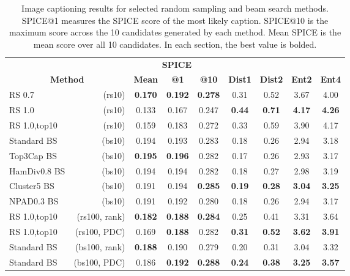 \documentclass[thesis.tex]{subfiles}
\begin{document}
\begin{table*}
    \small
    \centering
\begin{tabular}{|lr||ccc||cccc|}
\hline
 & & \multicolumn{3}{c||}{\textbf{SPICE}} & & & & \\
\multicolumn{2}{|c||}{\textbf{Method}} & \textbf{Mean} & \textbf{@1} & \textbf{@10} & \textbf{Dist1} & \textbf{Dist2} & \textbf{Ent2} & \textbf{Ent4}  \\
\hline\hline
RS 0.7 &(rs10)               & \textbf{0.170} & \textbf{0.192} & \textbf{0.278} & 0.31 & 0.52 & 3.67 & 4.00 \\
RS 1.0 &(rs10)               & 0.133 & 0.167 & 0.247 & \textbf{0.44} & \textbf{0.71} & \textbf{4.17} & \textbf{4.26} \\
RS 1.0,top10 &(rs10)         & 0.159 & 0.183 & 0.272 & 0.33 & 0.59 & 3.90 & 4.17 \\
\hline \hline
Standard BS &(bs10)               & 0.194 & 0.193 & 0.283 & 0.18 & 0.26 & 2.94 & 3.18 \\
Top3Cap BS &(bs10)                & \textbf{0.195} & \textbf{0.196} & 0.282 & 0.17 & 0.26 & 2.93 & 3.17 \\
HamDiv0.8 BS &(bs10)              & 0.194 & 0.194 & 0.282 & 0.18 & 0.27 & 2.98 & 3.19 \\
Cluster5 BS &(bs10)               & 0.191 & 0.194 & \textbf{0.285} & \textbf{0.19} & \textbf{0.28} & \textbf{3.04} & \textbf{3.25} \\
NPAD0.3 BS &(bs10)                & 0.191 & 0.192 & 0.280 & 0.18 & 0.26 & 2.94 & 3.17 \\
\hline \hline
RS 1.0,top10 &(rs100, rank)  & \textbf{0.182} & \textbf{0.188} & \textbf{0.284} & 0.25 & 0.41 & 3.31 & 3.64 \\
RS 1.0,top10 &(rs100, PDC)   & 0.169 & \textbf{0.188} & 0.282 & \textbf{0.31} & \textbf{0.52} & \textbf{3.62} & \textbf{3.91} \\
\hline \hline
Standard BS &(bs100, rank)        & \textbf{0.188} & 0.190 & 0.279 & 0.20 & 0.31 & 3.04 & 3.32 \\
Standard BS &(bs100, PDC)         & 0.186 & \textbf{0.192} & \textbf{0.288} & \textbf{0.24} & \textbf{0.38} & \textbf{3.25} & \textbf{3.57} \\
\hline
\end{tabular}
\caption{Image captioning results for selected random sampling and beam search methods. SPICE@1 measures the SPICE score of the most likely caption. SPICE@10 is the maximum score across the 10 candidates generated by each method. Mean SPICE is the mean score over all 10 candidates. In each section, the best value is bolded.}
\label{tab:diversity_image_captioning}
\end{table*}
\end{document}
